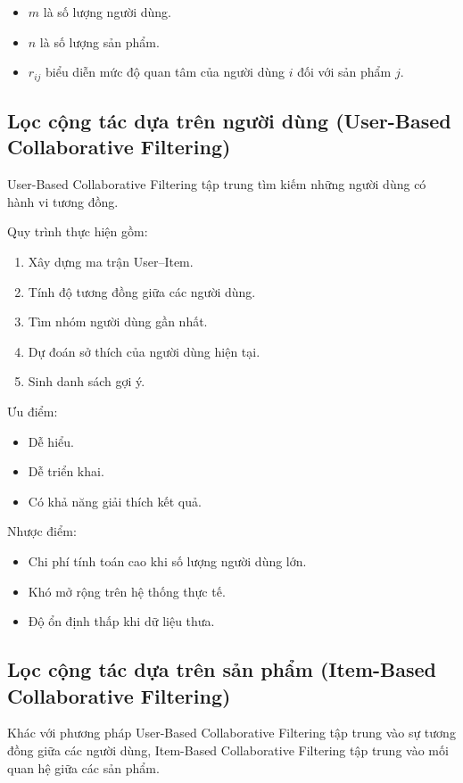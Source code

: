 \documentclass{report}
\begin{document}
\begin{itemize}
\item $m$ là số lượng người dùng.
\item $n$ là số lượng sản phẩm.
\item $r_{ij}$ biểu diễn mức độ quan tâm của người dùng $i$ đối với sản phẩm $j$.
\end{itemize}

\subsection{Lọc cộng tác dựa trên người dùng (User-Based Collaborative Filtering)}

User-Based Collaborative Filtering tập trung tìm kiếm những người dùng có hành vi tương đồng.

Quy trình thực hiện gồm:

\begin{enumerate}
\item Xây dựng ma trận User--Item.
\item Tính độ tương đồng giữa các người dùng.
\item Tìm nhóm người dùng gần nhất.
\item Dự đoán sở thích của người dùng hiện tại.
\item Sinh danh sách gợi ý.
\end{enumerate}

Ưu điểm:

\begin{itemize}
\item Dễ hiểu.
\item Dễ triển khai.
\item Có khả năng giải thích kết quả.
\end{itemize}

Nhược điểm:

\begin{itemize}
\item Chi phí tính toán cao khi số lượng người dùng lớn.
\item Khó mở rộng trên hệ thống thực tế.
\item Độ ổn định thấp khi dữ liệu thưa.
\end{itemize}

\subsection{Lọc cộng tác dựa trên sản phẩm (Item-Based Collaborative Filtering)}

Khác với phương pháp User-Based Collaborative Filtering tập trung vào sự tương đồng giữa các người dùng, Item-Based Collaborative Filtering tập trung vào mối quan hệ giữa các sản phẩm.
\end{document}

